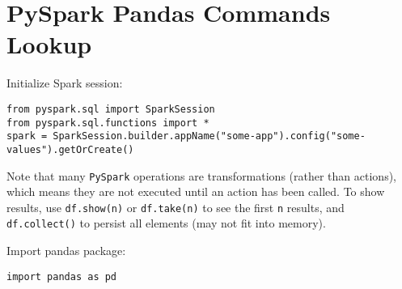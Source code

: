 \documentclass{article}
\begin{document}
\section*{PySpark Pandas Commands Lookup}

Initialize Spark session: 
\begin{verbatim}
from pyspark.sql import SparkSession
from pyspark.sql.functions import *
spark = SparkSession.builder.appName("some-app").config("some-values").getOrCreate()
\end{verbatim}

\noindent
Note that many \verb|PySpark| operations are transformations (rather than actions), 
which means they are not executed until an action has been called. To show results, 
use \verb|df.show(n)| or \verb|df.take(n)| to see the first \verb|n| results, 
and \verb|df.collect()| to persist all elements (may not fit into memory).
\newline

\noindent
Import pandas package: 
\begin{verbatim}
import pandas as pd
\end{verbatim}
\end{document}
